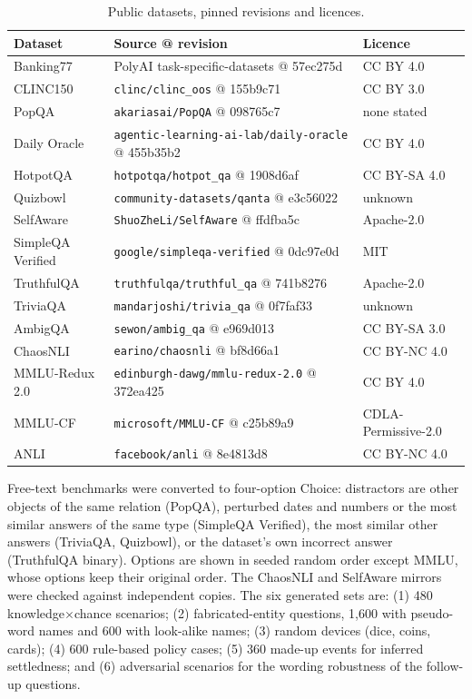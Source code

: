 \documentclass[10pt,twocolumn]{article}
\begin{document}
\begin{table}[h]
\centering\small
\caption{Public datasets, pinned revisions and licences.}
\begin{tabular}{@{}l l l@{}}
\toprule
Dataset & Source @ revision & Licence \\
\midrule
Banking77 \citep{casanueva2020efficient} & PolyAI task-specific-datasets @ 57ec275d & CC BY 4.0 \\
CLINC150 \citep{larson2019evaluation} & \texttt{clinc/clinc\_oos} @ 155b9c71 & CC BY 3.0 \\
PopQA \citep{mallen2023popqa} & \texttt{akariasai/PopQA} @ 098765c7 & none stated \\
Daily Oracle \citep{dai2025dailyoracle} & \texttt{agentic-learning-ai-lab/daily-oracle} @ 455b35b2 & CC BY 4.0 \\
HotpotQA \citep{yang2018hotpotqa} & \texttt{hotpotqa/hotpot\_qa} @ 1908d6af & CC BY-SA 4.0 \\
Quizbowl \citep{rodriguez2019quizbowl} & \texttt{community-datasets/qanta} @ e3c56022 & unknown \\
SelfAware \citep{yin2023selfaware} & \texttt{ShuoZheLi/SelfAware} @ ffdfba5c & Apache-2.0 \\
SimpleQA Verified \citep{simpleqaverified2025} & \texttt{google/simpleqa-verified} @ 0dc97e0d & MIT \\
TruthfulQA \citep{lin2022truthfulqa} & \texttt{truthfulqa/truthful\_qa} @ 741b8276 & Apache-2.0 \\
TriviaQA \citep{joshi2017triviaqa} & \texttt{mandarjoshi/trivia\_qa} @ 0f7faf33 & unknown \\
AmbigQA \citep{min2020ambigqa} & \texttt{sewon/ambig\_qa} @ e969d013 & CC BY-SA 3.0 \\
ChaosNLI \citep{nie2020chaosnli} & \texttt{earino/chaosnli} @ bf8d66a1 & CC BY-NC 4.0 \\
MMLU-Redux 2.0 \citep{gema2025mmluredux} & \texttt{edinburgh-dawg/mmlu-redux-2.0} @ 372ea425 & CC BY 4.0 \\
MMLU-CF \citep{zhao2024mmlucf} & \texttt{microsoft/MMLU-CF} @ c25b89a9 & CDLA-Permissive-2.0 \\
ANLI \citep{nie2020anli} & \texttt{facebook/anli} @ 8e4813d8 & CC BY-NC 4.0 \\
\bottomrule
\end{tabular}
\end{table}

Free-text benchmarks were converted to four-option Choice: distractors are
other objects of the same relation (PopQA), perturbed dates and numbers or the
most similar answers of the same type (SimpleQA Verified), the most similar
other answers (TriviaQA, Quizbowl), or the dataset's own incorrect answer
(TruthfulQA binary). Options are shown in seeded random order except MMLU,
whose options keep their original order. The ChaosNLI and SelfAware mirrors
were checked against independent copies. The six generated sets are: (1) 480
knowledge$\times$chance scenarios; (2) fabricated-entity questions, 1{,}600
with pseudo-word names and 600 with look-alike names; (3) random devices
(dice, coins, cards); (4) 600 rule-based policy cases; (5) 360 made-up events
for inferred settledness; and (6) adversarial scenarios for the wording
robustness of the follow-up questions.
\end{document}
